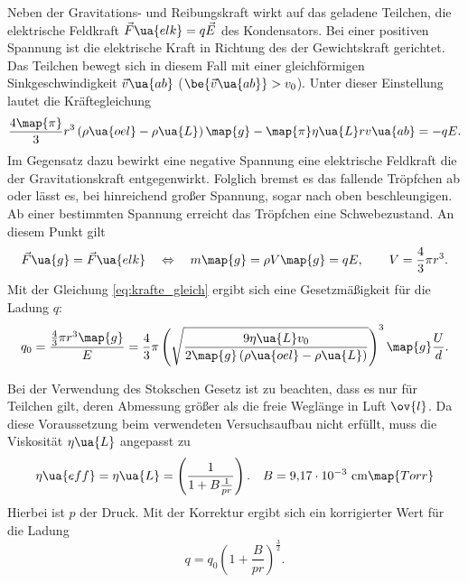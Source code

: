 Neben der Gravitations- und Reibungskraft wirkt auf das geladene Teilchen, %
die elektrische Feldkraft $\vec{F}\ua{elk}=q\vec{E}$ des Kondensators. %
Bei einer positiven Spannung ist die elektrische Kraft in Richtung des der Gewichtskraft gerichtet. %
Das Teilchen bewegt sich in diesem Fall mit einer gleichförmigen Sinkgeschwindigkeit $\vec{v}\ua{ab}$ ($\be{\vec{v}\ua{ab}}>v_0$).
Unter dieser Einstellung lautet die Kräftegleichung
\begin{equation}
  \label{eq:kraefte_eins}
    \frac{4\map{\pi}}{3}r^3\left(\rho\ua{oel}-\rho\ua{L}\right)\map{g}-\map{\pi}\eta\ua{L}r v\ua{ab}=-qE.
\end{equation}
Im Gegensatz dazu bewirkt eine negative Spannung eine elektrische Feldkraft die der Gravitationskraft
entgegenwirkt. Folglich bremst es das fallende Tröpfchen ab oder
lässt es, bei hinreichend großer Spannung, sogar nach oben beschleungigen. %
Ab einer bestimmten Spannung erreicht das Tröpfchen eine Schwebezustand. An diesem %
Punkt gilt
\begin{equation}
  \label{eq:krafte_gleich}
  \vec{F}\ua{g}=\vec{F}\ua{elk} \quad \Leftrightarrow \quad m\map{g}=\rho V\map{g}=qE, \qquad V=\frac{4}{3}\pi r^3.
\end{equation}
Mit der Gleichung \eqref{eq:krafte_gleich} ergibt sich eine Gesetzmäßigkeit für die Ladung $q$:
\begin{equation}%
  \label{eq:q}
  q_0=\frac{\frac{4}{3}\pi r^3 \map{g}}{E} =\frac{4}{3} \pi \left( \sqrt{\frac{9\eta\ua{L}v_0}{2\map{g}\left(\rho\ua{oel}-\rho\ua{L}\right)}}\right)^3 \map{g} \frac{U}{d}.
\end{equation}

Bei der Verwendung des Stokschen Gesetz ist zu beachten, dass es nur für Teilchen gilt,%
deren Abmessung größer als die freie Weglänge in Luft $\ov{l}$. %
Da diese Voraussetzung beim verwendeten Versuchsaufbau nicht erfüllt, muss die Viskosität $\eta\ua{L}$ %
angepasst zu %
\begin{equation*}
  \eta\ua{eff}=\eta\ua{L}=\left(\frac{1}{1+B\frac{1}{pr}}\right). \quad B=\SI{9.17e-3}\,\si{\centi\meter}\map{Torr}
\end{equation*}
Hierbei ist $p$ der Druck. Mit der Korrektur ergibt sich ein korrigierter Wert für die Ladung %
\begin{equation}
  \label{eq:q_korri}
  q=q_0\left(1+\frac{B}{pr}\right)^{\frac{3}{2}}.
\end{equation}
